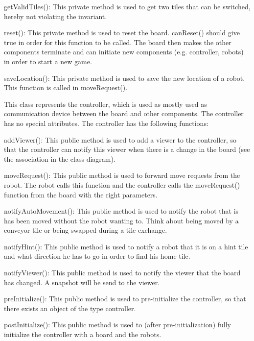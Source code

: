 \begin{description}
\begin{description}
            \item getValidTiles(): This private method is used to get two tiles that can be switched, hereby not violating the invariant.
            \item reset(): This private method is used to reset the board. canReset() should give true in order for this function to be called. The board then makes the other components terminate and can initiate new components (e.g. controller, robots) in order to start a new game.
            \item saveLocation(): This private method is used to save the new location of a robot. This function is called in moveRequest().
        \end{description}
		\item[Controller] This class represents the controller, which is used as mostly used as communication device between the board and other components. The controller has no special attributes. The controller has the following functions:
        \begin{description}
            \item addViewer(): This public method is used to add a viewer to the controller, so that the controller can notify this viewer when there is a change in the board (see the association in the class diagram).
            \item moveRequest(): This public method is used to forward move requests from the robot. The robot calls this function and the controller calls the moveRequest() function from the board with the right parameters.
            \item notifyAutoMovement(): This public method is used to notify the robot that is has been moved without the robot wanting to. Think about being moved by a conveyor tile or being swapped during a tile exchange.
            \item notifyHint(): This public method is used to notify a robot that it is on a hint tile and what direction he has to go in order to find his home tile.
            \item notifyViewer(): This public method is used to notify the viewer that the board has changed. A snapshot will be send to the viewer.
            \item preInitialize(): This public method is used to pre-initialize the controller, so that there exists an object of the type controller.
            \item postInitialize(): This public method is used to (after pre-initialization) fully initialize the controller with a board and the robots.

\end{description}
\end{description}

